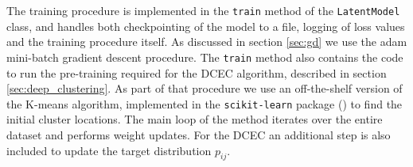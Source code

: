 % 

The training procedure is implemented in the \lstinline{train} method of the \lstinline{LatentModel} class, and handles both checkpointing of the model to a file, logging of loss values and the training procedure itself. As discussed in section \ref{sec:gd} we use the adam mini-batch gradient descent procedure. The \lstinline{train} method also contains the code to run the pre-training required for the DCEC algorithm, described in section \ref{sec:deep_clustering}. As part of that procedure we use an off-the-shelf version of the K-means algorithm, implemented in the \lstinline{scikit-learn} package (\cite{Pedregosa2011}) to find the initial cluster locations. The main loop of the method iterates over the entire dataset and performs weight updates. For the  DCEC an additional step is also included to update the target distribution $p_{ij}$.
